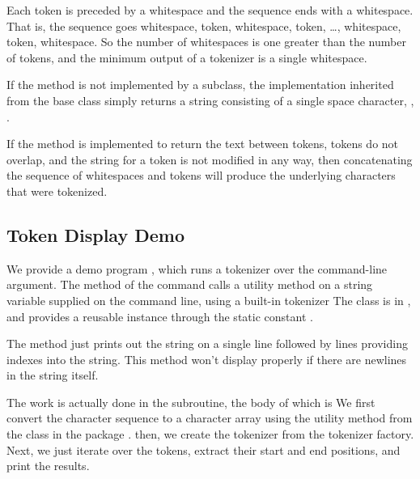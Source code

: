 Each token is preceded by a whitespace and the sequence ends with a
whitespace.  That is, the sequence goes whitespace, token, whitespace,
token, \ldots, whitespace, token, whitespace.  So the number of
whitespaces is one greater than the number of tokens, and the minimum
output of a tokenizer is a single whitespace.

If the  method is not implemented by a
subclass, the implementation inherited from the  base
class simply returns a string consisting of a single space character,
, .

If the  method is implemented to return the
text between tokens, tokens do not overlap, and the string for a token
is not modified in any way, then concatenating the sequence of
whitespaces and tokens will produce the underlying characters that
were tokenized.


\subsection{Token Display Demo}

We provide a demo program , which runs a tokenizer
over the command-line argument.  The  method of the command
calls a utility method on a string variable  supplied
on the command line, using a built-in tokenizer
%
%
The  class is in
, and provides a reusable instance through the static constant
.

The  method just prints out the string on
a single line followed by lines providing indexes into the string.
This method won't display properly if there are newlines in the string
itself.

The work is actually done in the subroutine, the body of which is
%
%
We first convert the character sequence  to a 
character array using the utility method 
from the class  in the package .
then, we create the tokenizer from the tokenizer factory.
Next, we just iterate over the tokens, extract their start and end
positions, and print the results.

